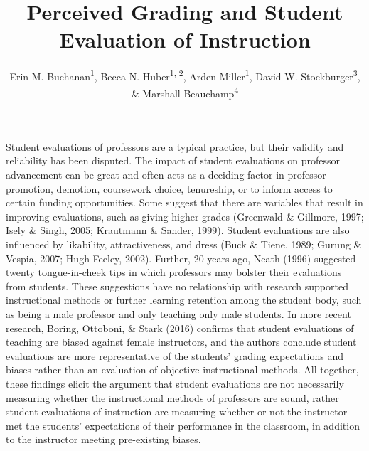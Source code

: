 \documentclass[man]{apa6}
\title{Perceived Grading and Student Evaluation of Instruction}
\author{Erin M. Buchanan\textsuperscript{1}, Becca N. Huber\textsuperscript{1, 2}, Arden Miller\textsuperscript{1}, David W. Stockburger\textsuperscript{3}, \& Marshall Beauchamp\textsuperscript{4}}
\affiliation{
    \vspace{0.5cm}
          \textsuperscript{1} Missouri State University\\
          \textsuperscript{2} Idaho State University\\
          \textsuperscript{3} US Air Force Academy\\
          \textsuperscript{4} University of Missouri - Kansas City  }
\newcounter{author}
\theoremstyle{definition}
\theoremstyle{definition}
\theoremstyle{definition}
\theoremstyle{remark}
\begin{document}
\maketitle

\setcounter{secnumdepth}{0}



Student evaluations of professors are a typical practice, but their
validity and reliability has been disputed. The impact of student
evaluations on professor advancement can be great and often acts as a
deciding factor in professor promotion, demotion, coursework choice,
tenureship, or to inform access to certain funding opportunities. Some
suggest that there are variables that result in improving evaluations,
such as giving higher grades (Greenwald \& Gillmore, 1997; Isely \&
Singh, 2005; Krautmann \& Sander, 1999). Student evaluations are also
influenced by likability, attractiveness, and dress (Buck \& Tiene,
1989; Gurung \& Vespia, 2007; Hugh Feeley, 2002). Further, 20 years ago,
Neath (1996) suggested twenty tongue-in-cheek tips in which professors
may bolster their evaluations from students. These suggestions have no
relationship with research supported instructional methods or further
learning retention among the student body, such as being a male
professor and only teaching only male students. In more recent research,
Boring, Ottoboni, \& Stark (2016) confirms that student evaluations of
teaching are biased against female instructors, and the authors conclude
student evaluations are more representative of the students' grading
expectations and biases rather than an evaluation of objective
instructional methods. All together, these findings elicit the argument
that student evaluations are not necessarily measuring whether the
instructional methods of professors are sound, rather student
evaluations of instruction are measuring whether or not the instructor
met the students' expectations of their performance in the classroom, in
addition to the instructor meeting pre-existing biases.
\end{document}
